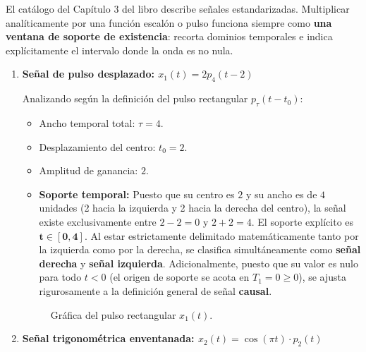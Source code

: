 \documentclass[10pt,a4paper]{article}
\begin{document}
	El catálogo del Capítulo 3 del libro describe señales estandarizadas. Multiplicar analíticamente por una función escalón o pulso funciona siempre como \textbf{una ventana de soporte de existencia}: recorta dominios temporales e indica explícitamente el intervalo donde la onda es no nula.
		
		\begin{enumerate}[label=\textbf{\alph*)}]
			\item \textbf{Señal de pulso desplazado: $x_1(t) = 2 p_{4}(t - 2)$}
			
			Analizando según la definición del pulso rectangular $p_\tau(t-t_0)$:
			\begin{itemize}
			    \item Ancho temporal total: $\tau=4$.
			    \item Desplazamiento del centro: $t_0=2$.
			    \item Amplitud de ganancia: $2$.
			    \item \textbf{Soporte temporal:} Puesto que su centro es $2$ y su ancho es de $4$ unidades (2 hacia la izquierda y 2 hacia la derecha del centro), la señal existe exclusivamente entre $2 - 2 = 0$ y $2 + 2 = 4$. El soporte explícito es $\mathbf{t \in [0, 4]}$. Al estar estrictamente delimitado matemáticamente tanto por la izquierda como por la derecha, se clasifica simultáneamente como \textbf{señal derecha} y \textbf{señal izquierda}. Adicionalmente, puesto que su valor es nulo para todo $t < 0$ (el origen de soporte se acota en $T_1 = 0 \ge 0$), se ajusta rigurosamente a la definición general de señal \textbf{causal}.
			\end{itemize}
	
			\begin{figure}[H]
				\centering
				
				\caption{Gráfica del pulso rectangular $x_1(t)$.}
			\end{figure}
	
			\item \textbf{Señal trigonométrica enventanada: $x_2(t) = \cos(\pi t) \cdot p_2(t)$}
			

\end{enumerate}
\end{document}
